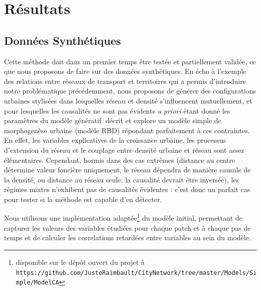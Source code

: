 \documentclass[french]{./sageo}
\begin{document}







\section{Résultats}


\subsection{Données Synthétiques}

Cette méthode doit dans un premier temps être testée et partiellement validée, ce que nous proposons de faire sur des données synthétiques. %
En écho à l'exemple des relations entre réseaux de transport et territoires qui a permis d'introduire notre problématique précédemment, nous proposons de générer des configurations urbaines stylisées dans lesquelles réseau et densité s'influencent mutuellement, et pour lesquelles les causalités ne sont pas évidents \emph{a priori} étant donné les paramètres du modèle génératif.\cite{raimbault2014hybrid} décrit et explore un modèle simple de morphogenèse urbaine (modèle RBD) répondant parfaitement à ces contraintes. En effet, les variables explicatives de la croissance urbaine, les processus d'extension du réseau et le couplage entre densité urbaine et réseau sont assez élémentaires. Cependant, hormis dans des cas extrêmes (distance au centre détermine valeur foncière uniquement, le réseau dépendra de manière causale de la densité, ou distance au réseau seule, la causalité devrait être inversée), les régimes mixtes n'exhibent pas de causalités évidentes : c'est donc un parfait cas pour tester si la méthode est capable d'en détecter.

Nous utilisons une implémentation adaptée\footnote{disponible sur le dépôt ouvert du projet à\\\texttt{https://github.com/JusteRaimbault/CityNetwork/tree/master/Models/Simple/ModelCA}} du modèle initial, permettant de capturer les valeurs des variables étudiées pour chaque patch et à chaque pas de temps et de calculer les correlations retardées entre variables au sein du modèle.
\end{document}
